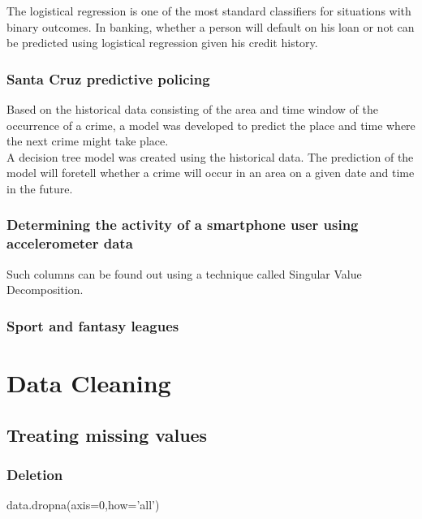 \documentclass{article}
\numberwithin{equation}{section} %
\begin{document}
The logistical regression is one of the most standard classifiers for situations with binary outcomes. In banking, whether a person will default on his loan or not can be predicted using logistical regression given his credit history. \\

\subsubsection*{Santa Cruz predictive policing}

Based on the historical data consisting of the area and time window of the occurrence of a crime, a model was developed to predict the place and time where the next crime might take place. \\

A decision tree model was created using the historical data. The prediction of
the model will foretell whether a crime will occur in an area on a given date
and time in the future. \\

\subsubsection*{Determining the activity of a smartphone user using accelerometer data}

Such columns can be found out using a technique called Singular Value Decomposition.

\subsubsection*{Sport and fantasy leagues}


\newpage

\section{Data Cleaning}

\subsection*{Treating missing values}

\subsubsection*{Deletion}

data.dropna(axis=0,how='all')\\
\end{document}
